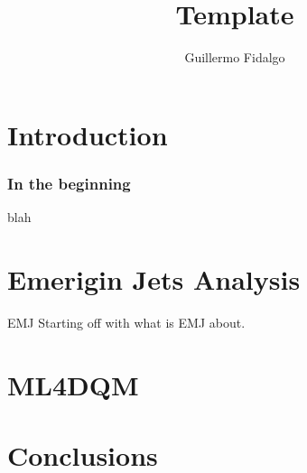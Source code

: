 \documentclass{beamer}
\title{Template}
\author[GAFR]{Guillermo Fidalgo}
\institute[UPRM]{University of Puerto Rico - Mayagüez}
\begin{document}
\maketitle

\section{Introduction}
\begin{frame}
	\frametitle{In the beginning}

	blah
\end{frame}

\section{Emerigin Jets Analysis}

\begin{frame}{EMJ}
	Starting off with what is EMJ about.


\end{frame}

\section{ML4DQM}


\section{Conclusions}
\end{document}

